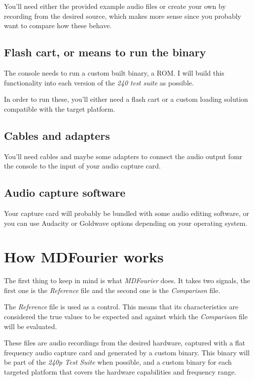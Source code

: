 \documentclass[10pt,a4paper]{report}
\begin{document}
You'll need either the provided example audio files or create your own by recording from the desired source, which makes more sense since you probably want to compare how these behave.

\section{Flash cart, or means to run the binary}

The console needs to run a custom built binary, a ROM. I will build this functionality into each version of the \textit{240 test suite}\cite{240pSuite} as possible.

In order to run these, you'll either need a flash cart or a custom loading solution compatible with the target platform.

\section{Cables and adapters}

You'll need cables and maybe some adapters to connect the audio output fomr the console to the input of your audio capture card.

\section{Audio capture software}

Your capture card will probably be bundled with some audio editing software, or you can use  Audacity\cite{audacity} or Goldwave\cite{goldwave} options depending on your operating system.

\chapter{How MDFourier works}
\label{howitworks}

The first thing to keep in mind is what \textit{MDFourier} does. It takes two signals, the first one is the \textit{Reference} file and the second one is the \textit{Comparison} file.

The \textit{Reference} file is used as a control. This means that its characteristics are considered the true values to be expected and against which the \textit{Comparison} file will be evaluated.

These files are audio recordings from the desired hardware, captured with a flat frequency audio capture card and generated by a custom binary. This binary will be part of the \textit{240p Test Suite}\cite{240pSuite} when possible, and a custom binary for each targeted platform that covers the hardware capabilities and frequency range.
\end{document}
